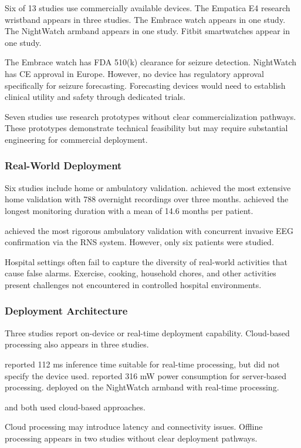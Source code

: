 Six of 13 studies use commercially available devices. The Empatica E4 research wristband appears in three studies. The Embrace watch appears in one study. The NightWatch armband appears in one study. Fitbit smartwatches appear in one study.

The Embrace watch has FDA 510(k) clearance for seizure detection. NightWatch has CE approval in Europe. However, no device has regulatory approval specifically for seizure forecasting. Forecasting devices would need to establish clinical utility and safety through dedicated trials.

Seven studies use research prototypes without clear commercialization pathways. These prototypes demonstrate technical feasibility but may require substantial engineering for commercial deployment.

\subsubsection{Real-World Deployment}

Six studies include home or ambulatory validation. \textcite{dongTwoLayerEnsembleMethod2022} achieved the most extensive home validation with 788 overnight recordings over three months. \textcite{stirlingForecastingSeizureLikelihood2021} achieved the longest monitoring duration with a mean of 14.6 months per patient.

\textcite{nasseriAmbulatorySeizureForecasting2021} achieved the most rigorous ambulatory validation with concurrent invasive EEG confirmation via the RNS system. However, only six patients were studied.

Hospital settings often fail to capture the diversity of real-world activities that cause false alarms. Exercise, cooking, household chores, and other activities present challenges not encountered in controlled hospital environments.

\subsubsection{Deployment Architecture}

Three studies report on-device or real-time deployment capability. Cloud-based processing also appears in three studies.

\textcite{spahrDeepLearningbasedDetection2025} reported 112 ms inference time suitable for real-time processing, but did not specify the device used. \textcite{borujenyDetectionEpilepticSeizure2013} reported 316 mW power consumption for server-based processing. \textcite{dongTwoLayerEnsembleMethod2022} deployed on the NightWatch armband with real-time processing.

\textcite{nasseriAmbulatorySeizureForecasting2021} and \textcite{odeDevelopmentEpilepticSeizure2023} both used cloud-based approaches. 

Cloud processing may introduce latency and connectivity issues. Offline processing appears in two studies without clear deployment pathways.

